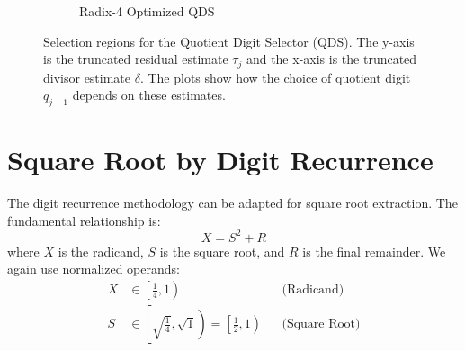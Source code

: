 \documentclass{article}
\begin{document}
\begin{figure}[htbp]
\begin{subfigure}[b]{0.32\textwidth}
    \caption{Radix-4 Optimized QDS}
    \label{fig:division:radix4_optimized}
  \end{subfigure}
  \caption{Selection regions for the Quotient Digit Selector (QDS). The y-axis is the truncated residual estimate $\tau_j$ and the x-axis is the truncated divisor estimate $\delta$. The plots show how the choice of quotient digit $q_{j+1}$ depends on these estimates.}
  \label{fig:division:qds}
\end{figure}

\section{Square Root by Digit Recurrence}
\label{sec:sqrt}
The digit recurrence methodology can be adapted for square root extraction.
The fundamental relationship is:
\begin{equation}
  \label{eq:sqrt:relation}
  X = S^2 + R
\end{equation}
where $X$ is the radicand, $S$ is the square root, and $R$ is the final remainder.
We again use normalized operands:
\begin{align*}
  X &\in \left[\frac{1}{4}, 1\right) && \text{(Radicand)} \\
  S &\in \left[\sqrt{\frac{1}{4}}, \sqrt{1}\right) = \left[\frac{1}{2}, 1\right) && \text{(Square Root)}
\end{align*}
\end{document}
